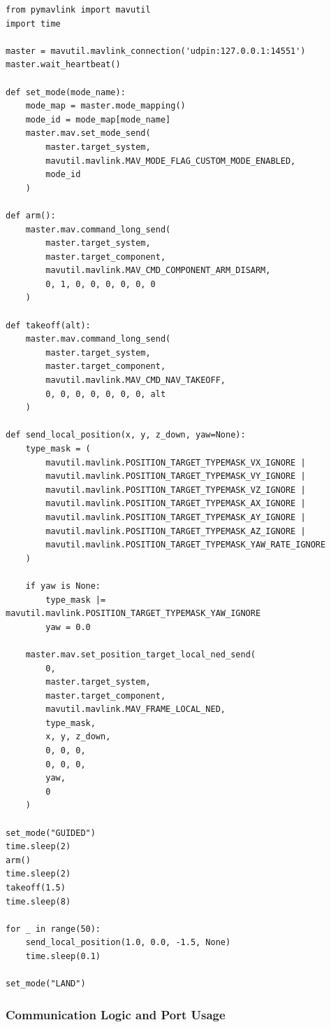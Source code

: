 \begin{verbatim}
from pymavlink import mavutil
import time

master = mavutil.mavlink_connection('udpin:127.0.0.1:14551')
master.wait_heartbeat()

def set_mode(mode_name):
    mode_map = master.mode_mapping()
    mode_id = mode_map[mode_name]
    master.mav.set_mode_send(
        master.target_system,
        mavutil.mavlink.MAV_MODE_FLAG_CUSTOM_MODE_ENABLED,
        mode_id
    )

def arm():
    master.mav.command_long_send(
        master.target_system,
        master.target_component,
        mavutil.mavlink.MAV_CMD_COMPONENT_ARM_DISARM,
        0, 1, 0, 0, 0, 0, 0, 0
    )

def takeoff(alt):
    master.mav.command_long_send(
        master.target_system,
        master.target_component,
        mavutil.mavlink.MAV_CMD_NAV_TAKEOFF,
        0, 0, 0, 0, 0, 0, 0, alt
    )

def send_local_position(x, y, z_down, yaw=None):
    type_mask = (
        mavutil.mavlink.POSITION_TARGET_TYPEMASK_VX_IGNORE |
        mavutil.mavlink.POSITION_TARGET_TYPEMASK_VY_IGNORE |
        mavutil.mavlink.POSITION_TARGET_TYPEMASK_VZ_IGNORE |
        mavutil.mavlink.POSITION_TARGET_TYPEMASK_AX_IGNORE |
        mavutil.mavlink.POSITION_TARGET_TYPEMASK_AY_IGNORE |
        mavutil.mavlink.POSITION_TARGET_TYPEMASK_AZ_IGNORE |
        mavutil.mavlink.POSITION_TARGET_TYPEMASK_YAW_RATE_IGNORE
    )

    if yaw is None:
        type_mask |= mavutil.mavlink.POSITION_TARGET_TYPEMASK_YAW_IGNORE
        yaw = 0.0

    master.mav.set_position_target_local_ned_send(
        0,
        master.target_system,
        master.target_component,
        mavutil.mavlink.MAV_FRAME_LOCAL_NED,
        type_mask,
        x, y, z_down,
        0, 0, 0,
        0, 0, 0,
        yaw,
        0
    )

set_mode("GUIDED")
time.sleep(2)
arm()
time.sleep(2)
takeoff(1.5)
time.sleep(8)

for _ in range(50):
    send_local_position(1.0, 0.0, -1.5, None)
    time.sleep(0.1)

set_mode("LAND")
\end{verbatim}


\subsubsection{Communication Logic and Port Usage}


